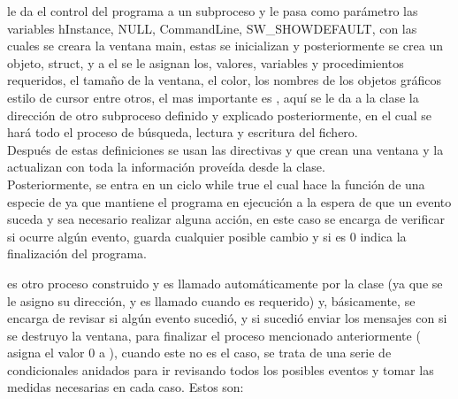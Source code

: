  le da el control del programa a un subproceso y le pasa
como parámetro las variables hInstance, NULL, CommandLine, SW\_SHOWDEFAULT, con
las cuales se creara la ventana main, estas se inicializan y posteriormente se
crea un objeto, struct, y a el se le asignan los, valores, variables y procedimientos
requeridos, el tamaño de la ventana, el color, los nombres de los objetos gráficos
estilo de cursor entre otros, el mas importante es
, aquí se le da a la clase la
dirección de otro subproceso definido y explicado posteriormente, en el cual se
hará todo el proceso de búsqueda, lectura y escritura del fichero. \\
Después de estas definiciones se usan las directivas 
y  que crean una ventana y la actualizan con toda
la información proveída desde la clase.\\
Posteriormente, se entra en un ciclo while true el cual hace la función de
una especie de  ya que mantiene el programa en ejecución a la
espera de que un evento suceda y sea necesario realizar alguna acción, en este caso
 se encarga de verificar si ocurre algún evento,
 guarda cualquier posible cambio y si es 0 indica la finalización
del programa.


 es otro proceso construido y es llamado automáticamente por la
clase (ya que se le asigno su dirección, y es llamado cuando es requerido) y, básicamente,
se encarga de revisar si algún evento sucedió, y si sucedió enviar los mensajes con
 si se destruyo la ventana, para finalizar el proceso
mencionado anteriormente ( asigna el valor 0 a ), cuando este no es el
caso, se trata de una serie de condicionales anidados para ir revisando todos los
posibles eventos y tomar las medidas necesarias en cada caso. Estos son:

